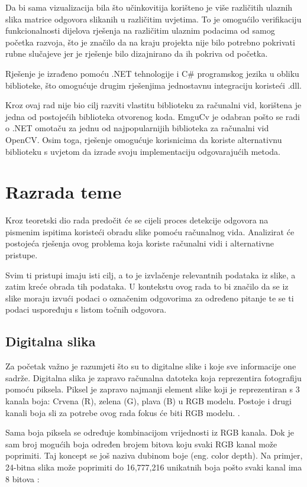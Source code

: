\documentclass{foi}
\begin{document}
Da bi sama vizualizacija bila što učinkovitija korišteno je više različitih ulaznih slika matrice odgovora slikanih u različitim uvjetima. To je omogućilo verifikaciju funkcionalnosti dijelova rješenja na različitim ulaznim podacima od samog početka razvoja, što je značilo da na kraju projekta nije bilo potrebno pokrivati rubne slučajeve jer je rješenje bilo dizajnirano da ih pokriva od početka.

Rješenje je izrađeno pomoću .NET tehnologije i C\# programskog jezika u obliku biblioteke, što omogućuje drugim rješenjima jednostavnu integraciju koristeći .dll. 

Kroz ovaj rad nije bio cilj razviti vlastitu biblioteku za računalni vid, korištena je jedna od  postojećih biblioteka otvorenog koda. EmguCv je odabran pošto se radi o .NET omotaču za jednu od najpopularnijih biblioteka za računalni vid OpenCV. Osim toga, rješenje omogućuje korisnicima da koriste alternativnu biblioteku s uvjetom da izrade svoju implementaciju odgovarajućih metoda.

\chapter{Razrada teme}

Kroz teoretski dio rada predočit će se cijeli proces detekcije odgovora na pismenim ispitima koristeći obradu slike pomoću računalnog vida. Analizirat će postojeća rješenja ovog problema koja koriste računalni vidi i alternativne pristupe. 

Svim ti pristupi imaju isti cilj, a to je izvlačenje relevantnih podataka iz slike, a zatim kreće obrada tih podataka. U kontekstu ovog rada to bi značilo da se iz slike moraju izvući podaci o označenim odgovorima za određeno pitanje te se ti podaci uspoređuju s listom točnih odgovora. 

\section{Digitalna slika }

Za početak važno je razumjeti što su to digitalne slike i koje sve informacije one sadrže. Digitalna slika je zapravo računalna datoteka koja reprezentira fotografiju pomoću piksela. Piksel je zapravo najmanji element slike koji je reprezentiran s 3 kanala boja: Crvena (R), zelena (G), plava (B) u RGB modelu. Postoje i drugi kanali boja sli za potrebe ovog rada fokus će biti RGB modelu.  \cite{DigitalnaSlika}.

Sama boja piksela se određuje kombinacijom vrijednosti iz RGB kanala. Dok je sam broj mogućih boja određen brojem bitova koju svaki RGB kanal može poprimiti. Taj koncept se još naziva dubinom boje (eng. color depth). Na primjer, 24-bitna slika može poprimiti do 16,777,216 unikatnih boja pošto svaki kanal ima 8 bitova \cite{DigitalnaSlika}:
\end{document}
